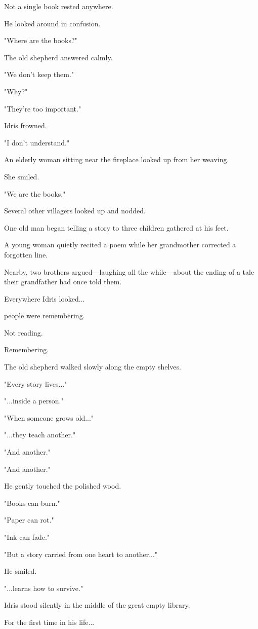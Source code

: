 \documentclass[12pt,openany]{book}
\begin{document}
Not a single book rested anywhere.

He looked around in confusion.

"Where are the books?"

The old shepherd answered calmly.

"We don't keep them."

"Why?"

"They're too important."

Idris frowned.

"I don't understand."

An elderly woman sitting near the fireplace looked up from her weaving.

She smiled.

"We are the books."

Several other villagers looked up and nodded.

One old man began telling a story to three children gathered at his feet.

A young woman quietly recited a poem while her grandmother corrected a forgotten line.

Nearby, two brothers argued—laughing all the while—about the ending of a tale their grandfather had once told them.

Everywhere Idris looked...

people were remembering.

Not reading.

Remembering.

The old shepherd walked slowly along the empty shelves.

"Every story lives..."

"...inside a person."

"When someone grows old..."

"...they teach another."

"And another."

"And another."

He gently touched the polished wood.

"Books can burn."

"Paper can rot."

"Ink can fade."

"But a story carried from one heart to another..."

He smiled.

"...learns how to survive."

Idris stood silently in the middle of the great empty library.

For the first time in his life...
\end{document}
